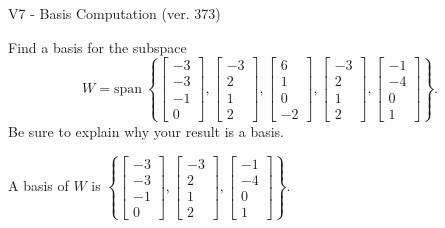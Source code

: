 \begin{exercise}
  \begin{exerciseTitle}V7 - Basis Computation (ver. 373)\end{exerciseTitle}
  \begin{exerciseStatement}
    Find a basis for the subspace 
\[W=\mathrm{span}\ \left\{\left[\begin{array}{r}
-3 \\
-3 \\
-1 \\
0
\end{array}\right] , \left[\begin{array}{r}
-3 \\
2 \\
1 \\
2
\end{array}\right] , \left[\begin{array}{r}
6 \\
1 \\
0 \\
-2
\end{array}\right] , \left[\begin{array}{r}
-3 \\
2 \\
1 \\
2
\end{array}\right] , \left[\begin{array}{r}
-1 \\
-4 \\
0 \\
1
\end{array}\right]\right\}.\]
 Be sure to explain why your result is a basis.


  \end{exerciseStatement}
  \begin{exerciseAnswer}
   A basis of \(W\) is  \(\left\{\left[\begin{array}{r}
-3 \\
-3 \\
-1 \\
0
\end{array}\right] , \left[\begin{array}{r}
-3 \\
2 \\
1 \\
2
\end{array}\right] , \left[\begin{array}{r}
-1 \\
-4 \\
0 \\
1
\end{array}\right]\right\}\).
  


  \end{exerciseAnswer}
\end{exercise}